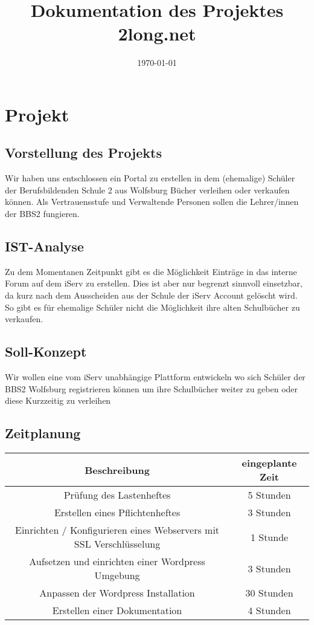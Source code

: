 \documentclass[a4paper, DIV20, 11pt, headsepline, parskip]{article}
\title{Dokumentation des Projektes 2long.net}
\author{\uauthor}
\newcommand{\udate}{\today}
\begin{document}
\date{\udate}
\maketitle
\thispagestyle{empty}
\newpage
\setcounter{page}{1}
\tableofcontents
\pagebreak
\section{Projekt}

\subsection{Vorstellung des Projekts}
Wir haben uns entschlossen ein Portal zu erstellen in dem (ehemalige) Schüler der Berufsbildenden Schule 2 aus Wolfsburg Bücher verleihen oder verkaufen können.
Als Vertrauensstufe und Verwaltende Personen sollen die Lehrer/innen der BBS2 fungieren. 
\subsection{IST-Analyse}
Zu dem Momentanen Zeitpunkt gibt es die Möglichkeit Einträge in das interne Forum auf dem iServ zu erstellen.
Dies ist aber nur begrenzt sinnvoll einsetzbar, da kurz nach dem Ausscheiden aus der Schule der iServ Account gelöscht wird.
So gibt es für ehemalige Schüler nicht die Möglichkeit ihre alten Schulbücher zu verkaufen.
\subsection{Soll-Konzept}
Wir wollen eine vom iServ unabhängige Plattform entwickeln wo sich Schüler der BBS2 Wolfsburg registrieren können um ihre Schulbücher weiter zu geben oder diese Kurzzeitig zu verleihen
\subsection{Zeitplanung}
\begin{tabular}{cc}
 Beschreibung & eingeplante Zeit\\
 \hline
 Prüfung des Lastenheftes & 5 Stunden\\
 Erstellen eines Pflichtenheftes & 3 Stunden\\
 Einrichten / Konfigurieren eines Webservers mit SSL Verschlüsselung & 1 Stunde\\
 Aufsetzen und einrichten einer Wordpress Umgebung & 3 Stunden\\
 Anpassen der Wordpress Installation & 30 Stunden\\
 Erstellen einer Dokumentation & 4 Stunden\\
\end{tabular}
\end{document}
